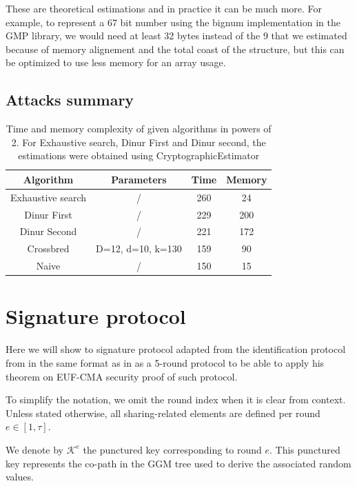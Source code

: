 \documentclass[english]{article}
\begin{document}
		These are theoretical estimations and in practice it can be much more. For example, to represent a 67 bit number using the bignum implementation in the GMP library, we would need at least 32 bytes instead of the 9 that we estimated because of memory alignement and the total coast of the structure, but this can be optimized to use less memory for an array usage.
		
	\subsection{Attacks summary}
		\begin{table}[h!]
		\begin{center}
			\begin{tabular}{|c|c|c|c|}
				\hline
				Algorithm & Parameters & Time & Memory \\
				\hline
				Exhaustive search & / & 260 & 24 \\
				\hline
				Dinur First & / & 229 & 200 \\
				\hline
				Dinur Second & / & 221 & 172 \\
				\hline
				Crossbred & D=12, d=10, k=130 & 159 & 90 \\
				\hline
				Naive & / & 150 & 15 \\
				\hline
			\end{tabular}
			\caption{Time and memory complexity of given algorithms in powers of 2.
				For Exhaustive search, Dinur First and Dinur second, the estimations were obtained using CryptographicEstimator \cite{EVZ+24}}
			\label{tab_attacks}
		\end{center}
		\end{table}

\printbibliography

\appendix
\section{Signature protocol}
	Here we will show to signature protocol adapted from the identification protocol from \cite{HJ23} in the same format as in \cite{feneu2023} as a 5-round protocol to be able to apply his theorem on EUF-CMA security proof of such protocol.
	
	To simplify the notation, we omit the round index when it is clear from context. Unless stated otherwise, all sharing-related elements are defined per round $e \in [1, \tau]$.
	
	We denote by $\mathcal{K}^e$ the punctured key corresponding to round $e$. This punctured key represents the co-path in the GGM tree used to derive the associated random values.
	
\end{document}
